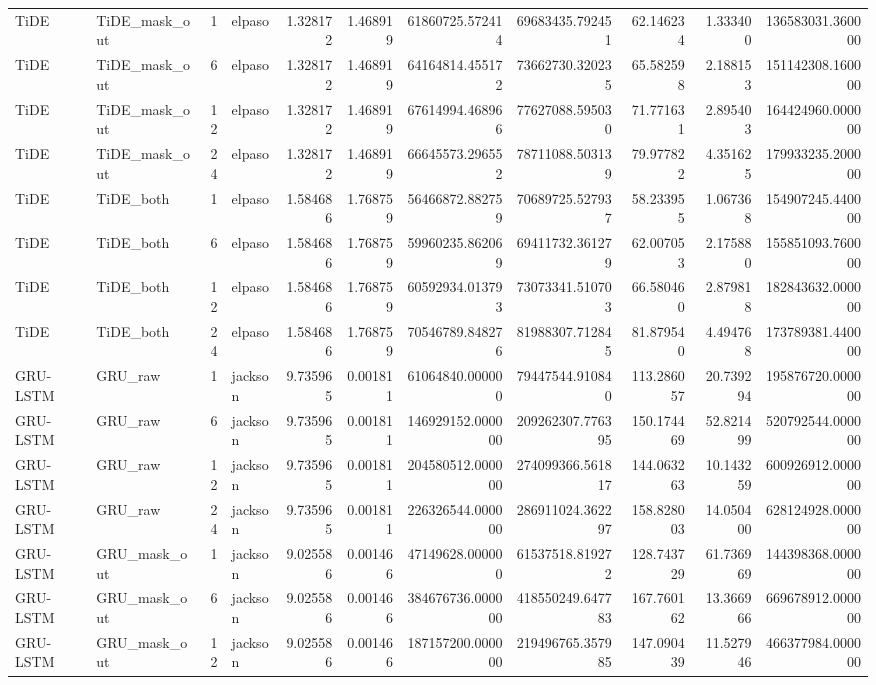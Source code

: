 \begin{longtable}{llrlrrrrrrr}
TiDE & TiDE\_mask\_out & 1 & elpaso & 1.328172 & 1.468919 & 61860725.572414 & 69683435.792451 & 62.146234 & 1.333400 & 136583031.360000 \\
TiDE & TiDE\_mask\_out & 6 & elpaso & 1.328172 & 1.468919 & 64164814.455172 & 73662730.320235 & 65.582598 & 2.188153 & 151142308.160000 \\
TiDE & TiDE\_mask\_out & 12 & elpaso & 1.328172 & 1.468919 & 67614994.468966 & 77627088.595030 & 71.771631 & 2.895403 & 164424960.000000 \\
TiDE & TiDE\_mask\_out & 24 & elpaso & 1.328172 & 1.468919 & 66645573.296552 & 78711088.503139 & 79.977822 & 4.351625 & 179933235.200000 \\
TiDE & TiDE\_both & 1 & elpaso & 1.584686 & 1.768759 & 56466872.882759 & 70689725.527937 & 58.233955 & 1.067368 & 154907245.440000 \\
TiDE & TiDE\_both & 6 & elpaso & 1.584686 & 1.768759 & 59960235.862069 & 69411732.361279 & 62.007053 & 2.175880 & 155851093.760000 \\
TiDE & TiDE\_both & 12 & elpaso & 1.584686 & 1.768759 & 60592934.013793 & 73073341.510703 & 66.580460 & 2.879818 & 182843632.000000 \\
TiDE & TiDE\_both & 24 & elpaso & 1.584686 & 1.768759 & 70546789.848276 & 81988307.712845 & 81.879540 & 4.494768 & 173789381.440000 \\
GRU-LSTM & GRU\_raw & 1 & jackson & 9.735965 & 0.001811 & 61064840.000000 & 79447544.910840 & 113.286057 & 20.739294 & 195876720.000000 \\
GRU-LSTM & GRU\_raw & 6 & jackson & 9.735965 & 0.001811 & 146929152.000000 & 209262307.776395 & 150.174469 & 52.821499 & 520792544.000000 \\
GRU-LSTM & GRU\_raw & 12 & jackson & 9.735965 & 0.001811 & 204580512.000000 & 274099366.561817 & 144.063263 & 10.143259 & 600926912.000000 \\
GRU-LSTM & GRU\_raw & 24 & jackson & 9.735965 & 0.001811 & 226326544.000000 & 286911024.362297 & 158.828003 & 14.050400 & 628124928.000000 \\
GRU-LSTM & GRU\_mask\_out & 1 & jackson & 9.025586 & 0.001466 & 47149628.000000 & 61537518.819272 & 128.743729 & 61.736969 & 144398368.000000 \\
GRU-LSTM & GRU\_mask\_out & 6 & jackson & 9.025586 & 0.001466 & 384676736.000000 & 418550249.647783 & 167.760162 & 13.366966 & 669678912.000000 \\
GRU-LSTM & GRU\_mask\_out & 12 & jackson & 9.025586 & 0.001466 & 187157200.000000 & 219496765.357985 & 147.090439 & 11.527946 & 466377984.000000 \\

\end{longtable}
